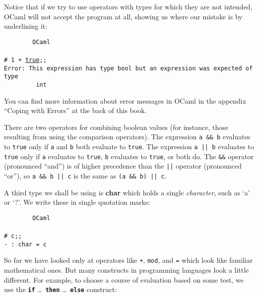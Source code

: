 \documentclass[]{book}
\newcommand\upquote[1]{\textquotesingle#1\textquotesingle}
\newcommand{\smspace}{\vspace{4mm}}
\begin{document}
\noindent Notice that if we try to use operators with types for which they are not intended, OCaml will not accept the program at all, showing us where our mistake is by underlining it:

\smspace
\noindent\verb!        OCaml!\\
\noindent\\
\noindent\texttt{\# 1 + \underline{\vphantom{g}true};;}\\
\noindent\texttt{Error:\ This expression has type bool but an expression was expected of type}\\
\noindent\verb!         int!
\smspace

\noindent You can find more information about error messages in OCaml in the appendix ``Coping with Errors'' at the back of this book.

\newcommand{\doublebar}{||}

There are two operators for combining boolean values (for instance, those resulting from using the comparison operators). The expression \texttt{a\! \&\&\! b} evaluates to \texttt{true} only if \texttt{a} and \texttt{b} both evaluate to \texttt{true}. The expression \index{\doublebar@\texttt{\doublebar}}\texttt{a\!\! ||\!\! b} evaluates to \texttt{true} only if \texttt{a} evaluates to \texttt{true}, \texttt{b} evaluates to \texttt{true}, or both do. The \texttt{\&\&} operator  (pronounced ``and'') is of higher precedence than the \texttt{||} operator (pronounced ``or''), so \texttt{a\! \&\&\! b\!\! ||\!\! c} is the same as \texttt{(a\! \&\&\! b)\!\! ||\!\! c}.

A third type we shall be using is \textbf{\textsf{char}} which holds a single \textit{character}, such as `a' or `?'. We write these in single quotation marks:

\smspace
\noindent\verb!        OCaml!\\
\noindent\\
\noindent\texttt{\# \upquote{c};;}\\
\noindent\texttt{- :\ char = \upquote{c}}
\smspace

\noindent So far we have looked only at operators like \texttt{+}, \texttt{mod}, and \texttt{=} which look like familiar mathematical ones. But many constructs in programming languages look a little different. For example, to choose a course of evaluation based on some test, we use the \texttt{\textbf{if}} \ldots\ \texttt{\textbf{then}} \ldots\  \texttt{\textbf{else}} construct:
\end{document}
